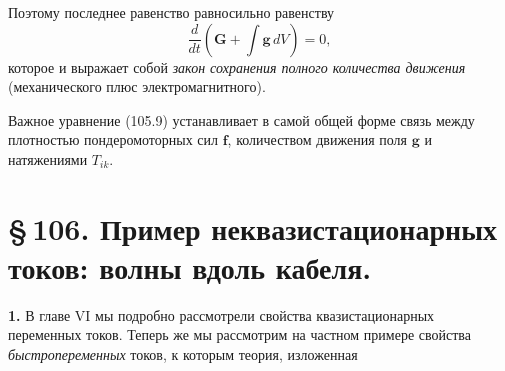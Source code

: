 \documentclass[a4paper,12pt]{article}
\begin{document}
Поэтому последнее равенство равносильно равенству
\begin{equation}
    \frac{d}{dt}\!\left(\mathbf{G} + \int\mathbf{g}\,dV\right) = 0,
    \tag{105.10}
\end{equation}
которое и выражает собой \textit{закон сохранения полного количества
движения} (механического плюс электромагнитного).

Важное уравнение (105.9) устанавливает в самой общей форме связь
между плотностью пондеромоторных сил $\mathbf{f}$, количеством движения
поля $\mathbf{g}$ и натяжениями $T_{ik}$.


\section*{\S\,106. Пример неквазистационарных токов: волны вдоль кабеля.}

\textbf{1.} В главе VI мы подробно рассмотрели свойства квазистационарных
переменных токов. Теперь же мы рассмотрим на частном примере свойства
\textit{быстропеременных} токов, к которым теория, изложенная
\end{document}
